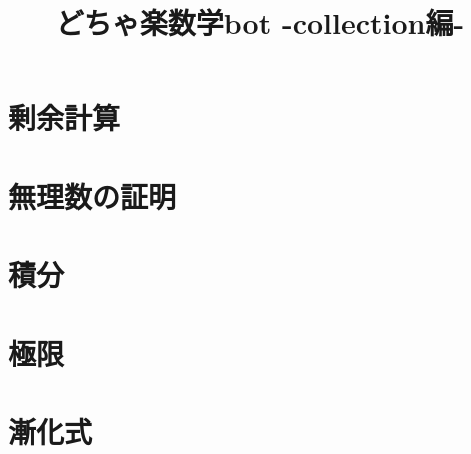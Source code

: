 \documentclass{jsreport}
\title{どちゃ楽数学bot -collection編-}
\author{}
\date{}
\begin{document}
\fontsize{9pt}{7pt}\selectfont
\lengthparam

\maketitle
\tableofcontents
\clearpage

\chapter{剰余計算}

\chapter{無理数の証明}

\chapter{積分}

\chapter{極限}

\chapter{漸化式}

\end{document}
